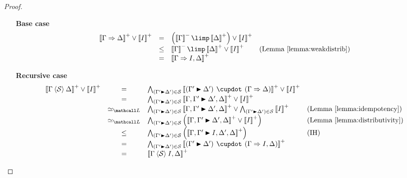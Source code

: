 \begin{proof}
  \begin{itemize}
    \item[\textbf{Base case}]
    $$
    \begin{array}{rcll}
      \psint{\Gamma \seq \Delta} \lor \psint{I}
      &=& \left(\nsint{\Gamma} \limp \psint{\Delta}\right) \lor \psint{I} & \\
      &\sement& \nsint{\Gamma} \limp \psint{\Delta} \lor \psint{I} &\text{(\reflemma{weakdistrib})} \\
      &=& \psint{\Gamma \seq I, \Delta} & \\
    \end{array}
    $$
    \item[\textbf{Recursive case}]
    $$
    \begin{array}{rcll}
      \psint{\Gamma \piq{\cS} \Delta} \lor \psint{I}
      &=& \psintAndMix{(\Gamma' \JB \Delta')}{\cS}{\Gamma}{\Delta} \lor \psint{I} & \\
      &=& \psintAnd{(\Gamma' \JB \Delta')}{\cS}{\Gamma, \Gamma' \JB \Delta', \Delta} \lor \psint{I} & \\
      &\semequiv_{\Lattice}& \psintAnd{(\Gamma' \JB \Delta')}{\cS}{\Gamma, \Gamma' \JB \Delta', \Delta} \lor \psintAnd{(\Gamma' \JB \Delta')}{\cS}{I} &\text{(\reflemma{idempotency})} \\
      &\semequiv_{\Lattice}& \bigwedge_{(\Gamma' \JB \Delta') \in \cS}{\left(\psint{\Gamma, \Gamma' \JB \Delta', \Delta} \lor \psint{I}\right)} &\text{(\reflemma{distributivity})} \\
      &\sement& \bigwedge_{(\Gamma' \JB \Delta') \in \cS}{\left(\psint{\Gamma, \Gamma' \JB I, \Delta', \Delta} \right)} &\text{(IH)} \\
      &=& \psintAndMix{(\Gamma' \JB \Delta')}{\cS}{\Gamma}{I, \Delta} & \\
      &=& \psint{\Gamma \piq{\cS} I, \Delta} & \\
    \end{array}
    $$
  \end{itemize}
\end{proof}

